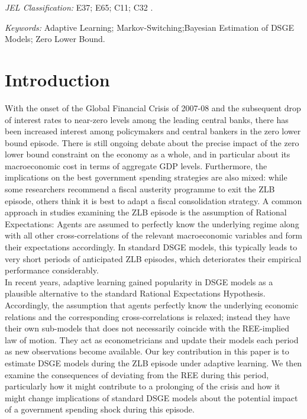 \documentclass[12pt,reqno]{article}
\numberwithin{equation}{section}
\begin{document}
\vspace{3 mm}

\noindent
\textit{JEL Classification:} E37; E65; C11; C32 . \\


\vspace{3 mm}

\noindent
\textit{Keywords:} Adaptive Learning; Markov-Switching;Bayesian Estimation of DSGE Models; Zero Lower Bound. 


\section{Introduction}

With the onset of the Global Financial Crisis of 2007-08 and the subsequent drop of interest rates to near-zero levels among the leading central banks, there has been increased interest among policymakers and central bankers in the zero lower bound episode. There is still ongoing debate about the precise impact of the zero lower bound constraint on the economy as a whole, and in particular about its macroeconomic cost in terms of aggregate GDP levels. Furthermore, the implications on the best government spending strategies are also mixed: while some researchers recommend a fiscal austerity programme to exit the ZLB episode, others think it is best to adapt a fiscal consolidation strategy. A common approach in studies examining the ZLB episode is the assumption of Rational Expectations: Agents are assumed to perfectly know the underlying regime along with all other cross-correlations of the relevant macroeconomic variables and form their expectations accordingly. In standard DSGE models, this typically leads to very short periods of anticipated ZLB episodes, which deteriorates their empirical performance considerably. \\

In recent years, adaptive learning gained popularity in DSGE models as a plausible alternative to the standard Rational Expectations Hypothesis. Accordingly, the assumption that agents perfectly know the underlying economic relations and the corresponding cross-correlations is relaxed; instead they have their own sub-models that does not necessarily coincide with the REE-implied law of motion. They act as econometricians and update their models each period as new observations become available. Our key contribution in this paper is to estimate DSGE models during the ZLB episode under adaptive learning. We then examine the consequences of deviating from the REE during this period, particularly how it might contribute to a prolonging of the crisis and how it might change implications of standard DSGE models about the potential impact of a government spending shock during this episode. \\
\end{document}
